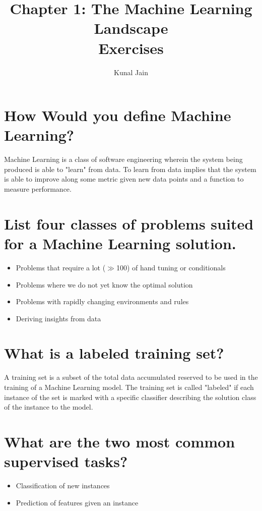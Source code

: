\documentclass[letterpaper,12pt]{article}
\begin{document}
	\title{Chapter 1: The Machine Learning Landscape \\
	\large Exercises}
	\author{Kunal Jain}
	\date{}
	\maketitle
	\section{How Would you define Machine Learning?}
	Machine Learning is a class of software engineering wherein the system being produced is able to "learn" from data. To learn from data implies that the system is able to improve along some metric given new data points and a function to measure performance.
	
	\section{List four classes of problems suited for a Machine Learning solution.}
	\begin{itemize}[leftmargin=*]
		\item Problems that require a lot ($\gg$100) of hand tuning or conditionals
		\item Problems where we do not yet know the optimal solution
		\item Problems with rapidly changing environments and rules
		\item Deriving insights from data
	\end{itemize}

	\section{What is a labeled training set?}
	A training set is a subset of the total data accumulated reserved to be used in the training of a Machine Learning model. The training set is called "labeled" if each instance of the set is marked with a specific classifier describing the solution class of the instance to the model.
	
	\section{What are the two most common supervised tasks?}
	\begin{itemize}[leftmargin=*]
		\item Classification of new instances
		\item Prediction of features given an instance
	\end{itemize}
\end{document}
